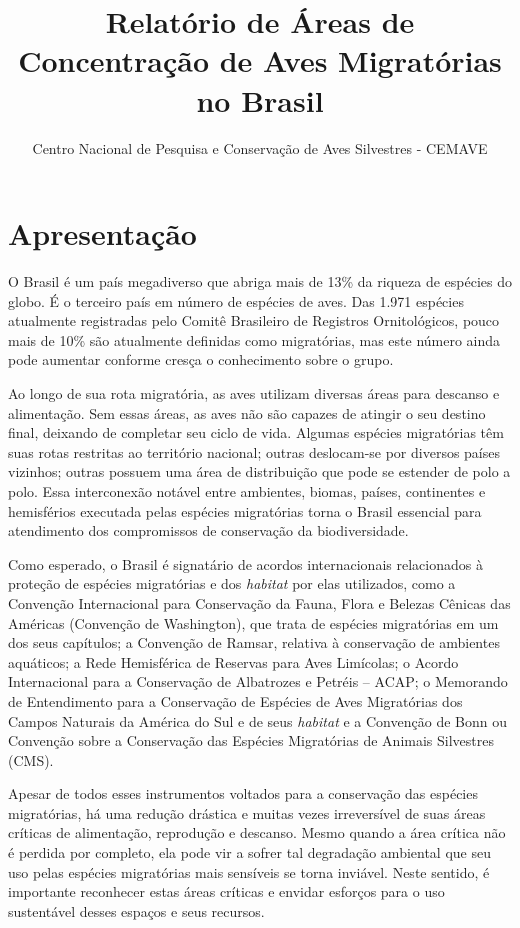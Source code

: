\documentclass[
  oneside]{scrbook}
\title{Relatório de Áreas de Concentração de Aves Migratórias no Brasil}
\author{Centro Nacional de Pesquisa e Conservação de Aves Silvestres - CEMAVE}
\date{}
\begin{document}

\maketitle

{
\setcounter{tocdepth}{1}
\tableofcontents
}
\pagestyle{plain}

\hypertarget{apresentacao}{%
\chapter*{Apresentação}\label{apresentacao}}

O Brasil é um país megadiverso que abriga mais de 13\% da riqueza de espécies do globo. É o terceiro país em número de espécies de aves. Das 1.971 espécies atualmente registradas pelo Comitê Brasileiro de Registros Ornitológicos, pouco mais de 10\% são atualmente definidas como migratórias, mas este número ainda pode aumentar conforme cresça o conhecimento sobre o grupo.

Ao longo de sua rota migratória, as aves utilizam diversas áreas para descanso e alimentação. Sem essas áreas, as aves não são capazes de atingir o seu destino final, deixando de completar seu ciclo de vida. Algumas espécies migratórias têm suas rotas restritas ao território nacional; outras deslocam-se por diversos países vizinhos; outras possuem uma área de distribuição que pode se estender de polo a polo. Essa interconexão notável entre ambientes, biomas, países, continentes e hemisférios executada pelas espécies migratórias torna o Brasil essencial para atendimento dos compromissos de conservação da biodiversidade.

Como esperado, o Brasil é signatário de acordos internacionais relacionados à proteção de espécies migratórias e dos \emph{habitat} por elas utilizados, como a Convenção Internacional para Conservação da Fauna, Flora e Belezas Cênicas das Américas (Convenção de Washington), que trata de espécies migratórias em um dos seus capítulos; a Convenção de Ramsar, relativa à conservação de ambientes aquáticos; a Rede Hemisférica de Reservas para Aves Limícolas; o Acordo Internacional para a Conservação de Albatrozes e Petréis -- ACAP; o Memorando de Entendimento para a Conservação de Espécies de Aves Migratórias dos Campos Naturais da América do Sul e de seus \emph{habitat} e a Convenção de Bonn ou Convenção sobre a Conservação das Espécies Migratórias de Animais Silvestres (CMS).

Apesar de todos esses instrumentos voltados para a conservação das espécies migratórias, há uma redução drástica e muitas vezes irreversível de suas áreas críticas de alimentação, reprodução e descanso. Mesmo quando a área crítica não é perdida por completo, ela pode vir a sofrer tal degradação ambiental que seu uso pelas espécies migratórias mais sensíveis se torna inviável. Neste sentido, é importante reconhecer estas áreas críticas e envidar esforços para o uso sustentável desses espaços e seus recursos.
\end{document}
